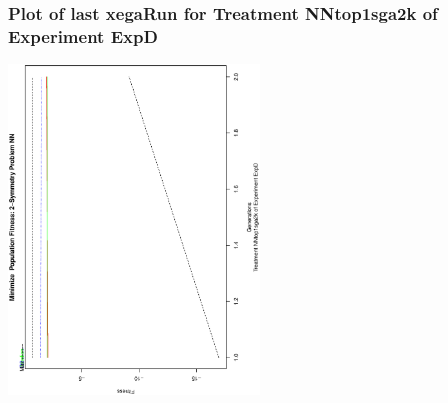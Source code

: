  \begin{frame}
 \frametitle{ Plot of last xegaRun for Treatment NNtop1sga2k of Experiment ExpD }
 \begin{center}
\includegraphics[width=0.5\textwidth, angle=-90]
{ExpDPlotPopStatsFigure000.eps}
 \end{center}
 \label{report/ExpDPlotPopStatsFigure000.eps}  
 \end{frame}

